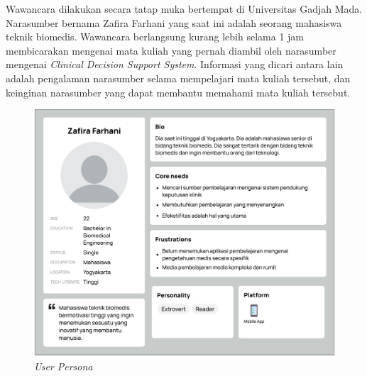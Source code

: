 Wawancara dilakukan secara tatap muka bertempat di Universitas Gadjah Mada. Narasumber bernama Zafira Farhani yang saat ini adalah seorang mahasiswa teknik biomedis.
Wawancara berlangsung kurang lebih selama 1 jam membicarakan mengenai mata kuliah yang pernah diambil oleh narasumber mengenai \textit{Clinical Decision Support System}.
Informasi yang dicari antara lain adalah pengalaman narasumber selama mempelajari mata kuliah tersebut, dan keinginan narasumber yang dapat membantu memahami mata kuliah tersebut.

\begin{figure}[H]
	\centering
	\includegraphics[width=\textwidth]{contents/chapter-3/images/up-dummy.png}
	\caption{\textit{User Persona}}
	\label{Fig:UserPersona}
\end{figure}

